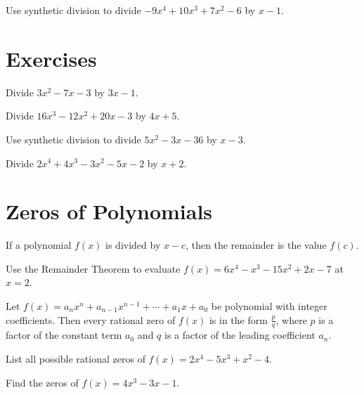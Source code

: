 \begin{example}
  Use synthetic division to divide $-9x^4+10x^3+7x^2-6$ by $x-1$.
\end{example}

\newpage
\section*{Exercises}

  \begin{exercise}
    Divide $3x^2 - 7 x - 3$ by $3x-1$.
  \end{exercise}

  \begin{exercise}
    Divide $16 x^3 - 12 x^2 + 20 x - 3$ by $4x+5$.
  \end{exercise}

  \begin{exercise}
  Use synthetic division to divide $5x^2-3x-36$ by $x-3$.
  \end{exercise}

  \begin{exercise}
  Divide $2 x^4 + 4 x^3 - 3 x^2 - 5 x - 2$ by $x+2$.
  \end{exercise}

\newpage
\section{Zeros of Polynomials}

\begin{theorem}
If a polynomial $f(x)$ is divided by $x-c$, then the remainder is the value $f(c)$.
\end{theorem}
\begin{example}
  Use the Remainder Theorem to evaluate $f(x)=6x^4-x^3-15x^2+2x-7$ at $x=2$.
\end{example}

\begin{theorem}
Let $f(x)=a_nx^n+a_{n-1}x^{n-1}+\cdots +a_1x+a_0$ be polynomial with integer coefficients. Then every rational zero of $f(x)$ is in the form $\frac{p}{q}$, where $p$ is a factor of the constant term $a_0$ and $q$ is a factor of the leading coefficient $a_n$.
\end{theorem}
\begin{example}
  List all possible rational zeros of $f(x)=2x^4-5x^3+x^2-4$.
\end{example}

\begin{example}
  Find the zeros of $f(x)=4x^3-3x-1$.
\end{example}

